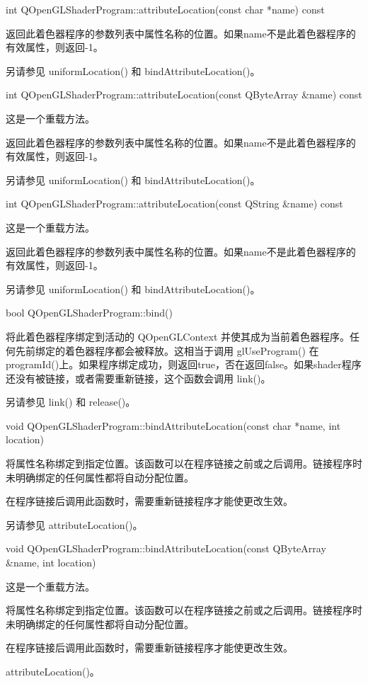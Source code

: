 int QOpenGLShaderProgram::attributeLocation(const char *name) const

返回此着色器程序的参数列表中属性名称的位置。如果name不是此着色器程序的有效属性，则返回-1。

另请参见 uniformLocation() 和 bindAttributeLocation()。

int QOpenGLShaderProgram::attributeLocation(const QByteArray \&name) const

这是一个重载方法。

返回此着色器程序的参数列表中属性名称的位置。如果name不是此着色器程序的有效属性，则返回-1。

另请参见 uniformLocation() 和 bindAttributeLocation()。

int QOpenGLShaderProgram::attributeLocation(const QString \&name) const

这是一个重载方法。

返回此着色器程序的参数列表中属性名称的位置。如果name不是此着色器程序的有效属性，则返回-1。

另请参见 uniformLocation() 和 bindAttributeLocation()。

bool QOpenGLShaderProgram::bind()

将此着色器程序绑定到活动的 QOpenGLContext 并使其成为当前着色器程序。任何先前绑定的着色器程序都会被释放。这相当于调用 glUseProgram() 在 programId()上。如果程序绑定成功，则返回true，否在返回false。如果shader程序还没有被链接，或者需要重新链接，这个函数会调用 link()。

另请参见 link() 和 release()。

void QOpenGLShaderProgram::bindAttributeLocation(const char *name, int location)

将属性名称绑定到指定位置。该函数可以在程序链接之前或之后调用。链接程序时未明确绑定的任何属性都将自动分配位置。

在程序链接后调用此函数时，需要重新链接程序才能使更改生效。

另请参见 attributeLocation()。

void QOpenGLShaderProgram::bindAttributeLocation(const QByteArray \&name, int location)

这是一个重载方法。

将属性名称绑定到指定位置。该函数可以在程序链接之前或之后调用。链接程序时未明确绑定的任何属性都将自动分配位置。

在程序链接后调用此函数时，需要重新链接程序才能使更改生效。

\begin{seeAlso}
attributeLocation()。
\end{seeAlso}

